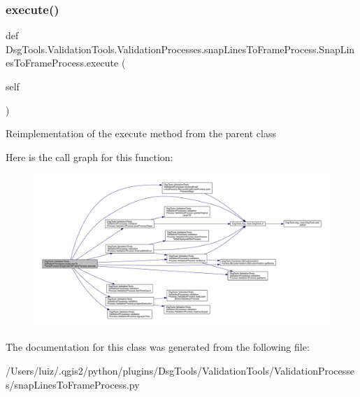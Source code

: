 \subsubsection{\texorpdfstring{execute()}{execute()}}
{\footnotesize\ttfamily def Dsg\+Tools.\+Validation\+Tools.\+Validation\+Processes.\+snap\+Lines\+To\+Frame\+Process.\+Snap\+Lines\+To\+Frame\+Process.\+execute (\begin{DoxyParamCaption}\item[{}]{self }\end{DoxyParamCaption})}

\begin{DoxyVerb}Reimplementation of the execute method from the parent class
\end{DoxyVerb}
 Here is the call graph for this function\+:
\nopagebreak
\begin{figure}[H]
\begin{center}
\leavevmode
\includegraphics[width=350pt]{class_dsg_tools_1_1_validation_tools_1_1_validation_processes_1_1snap_lines_to_frame_process_1_1_snap_lines_to_frame_process_af36ad7e2778de6c56e5b6246be685e4f_cgraph}
\end{center}
\end{figure}


The documentation for this class was generated from the following file\+:\begin{DoxyCompactItemize}
\item 
/\+Users/luiz/.\+qgis2/python/plugins/\+Dsg\+Tools/\+Validation\+Tools/\+Validation\+Processes/snap\+Lines\+To\+Frame\+Process.\+py\end{DoxyCompactItemize}
